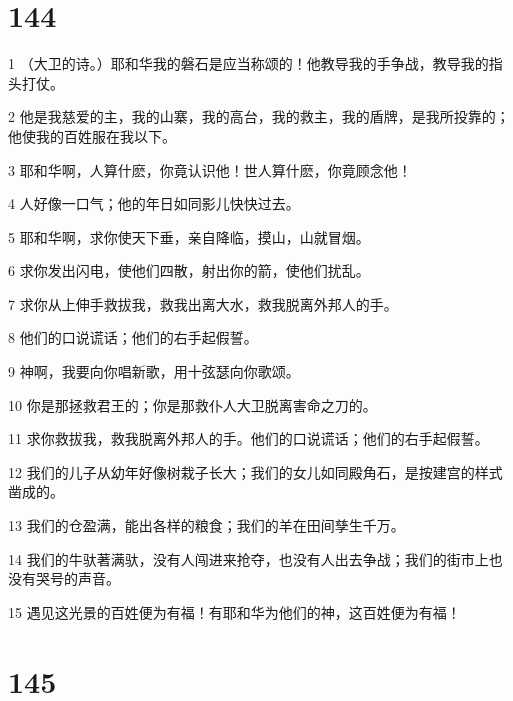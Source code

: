 \chapter{144}

\par 1 （大卫的诗。）耶和华我的磐石是应当称颂的！他教导我的手争战，教导我的指头打仗。
\par 2 他是我慈爱的主，我的山寨，我的高台，我的救主，我的盾牌，是我所投靠的；他使我的百姓服在我以下。
\par 3 耶和华啊，人算什麽，你竟认识他！世人算什麽，你竟顾念他！
\par 4 人好像一口气；他的年日如同影儿快快过去。
\par 5 耶和华啊，求你使天下垂，亲自降临，摸山，山就冒烟。
\par 6 求你发出闪电，使他们四散，射出你的箭，使他们扰乱。
\par 7 求你从上伸手救拔我，救我出离大水，救我脱离外邦人的手。
\par 8 他们的口说谎话；他们的右手起假誓。
\par 9 神啊，我要向你唱新歌，用十弦瑟向你歌颂。
\par 10 你是那拯救君王的；你是那救仆人大卫脱离害命之刀的。
\par 11 求你救拔我，救我脱离外邦人的手。他们的口说谎话；他们的右手起假誓。
\par 12 我们的儿子从幼年好像树栽子长大；我们的女儿如同殿角石，是按建宫的样式凿成的。
\par 13 我们的仓盈满，能出各样的粮食；我们的羊在田间孳生千万。
\par 14 我们的牛驮著满驮，没有人闯进来抢夺，也没有人出去争战；我们的街市上也没有哭号的声音。
\par 15 遇见这光景的百姓便为有福！有耶和华为他们的神，这百姓便为有福！

\chapter{145}

